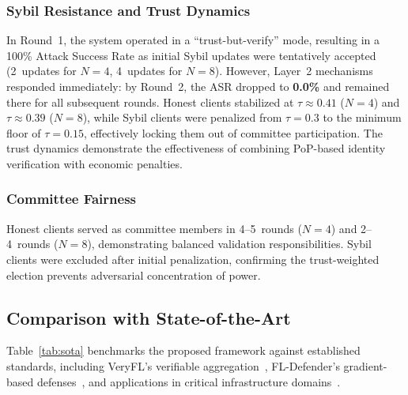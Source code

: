 \documentclass[conference]{IEEEtran}
\begin{document}
\subsubsection{Sybil Resistance and Trust Dynamics}

In Round~1, the system operated in a ``trust-but-verify'' mode, resulting in a 100\% Attack Success Rate as initial Sybil updates were tentatively accepted (2~updates for $N=4$, 4~updates for $N=8$). However, Layer~2 mechanisms responded immediately: by Round~2, the ASR dropped to \textbf{0.0\%} and remained there for all subsequent rounds. Honest clients stabilized at $\tau \approx 0.41$ ($N=4$) and $\tau \approx 0.39$ ($N=8$), while Sybil clients were penalized from $\tau = 0.3$ to the minimum floor of $\tau = 0.15$, effectively locking them out of committee participation. The trust dynamics demonstrate the effectiveness of combining PoP-based identity verification with economic penalties.

\subsubsection{Committee Fairness}

Honest clients served as committee members in 4--5~rounds ($N=4$) and 2--4~rounds ($N=8$), demonstrating balanced validation responsibilities. Sybil clients were excluded after initial penalization, confirming the trust-weighted election prevents adversarial concentration of power.

\subsection{Comparison with State-of-the-Art}

Table~\ref{tab:sota} benchmarks the proposed framework against established standards, including VeryFL's verifiable aggregation~\cite{li2025veryfl}, FL-Defender's gradient-based defenses~\cite{jebreel2023fl}, and applications in critical infrastructure domains~\cite{alashhab2024enhancing, asiri2023understanding, jayagopal2023intrusion}.
\end{document}
